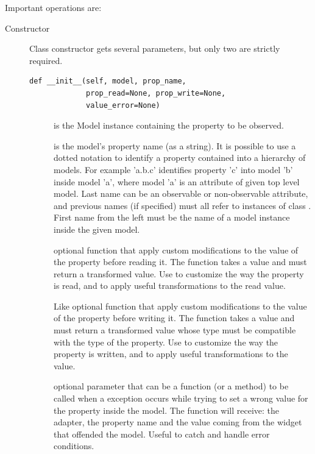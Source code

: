 Important operations are:

\begin{description}
\item [Constructor] Class constructor gets several parameters, but
  only two are strictly required.
{
\codesize
\begin{verbatim}
def __init__(self, model, prop_name, 
             prop_read=None, prop_write=None, 
             value_error=None)
\end{verbatim}
}

\begin{description}
  \item [] is the Model instance containing the
    property to be observed.

  \item [] is the model's property name (as a
    string). It is possible to use a dotted notation to identify a
    property contained into a hierarchy of models. For example
    'a.b.c' identifies property 'c' into model 'b' inside model 'a',
    where model 'a' is an attribute of given top level model. Last
    name can be an observable or non-observable attribute, and
    previous names (if specified) must all refer to instances of
    class . First name from the left must be the
    name of a model instance inside the given model.

  \item [] optional function that apply custom
    modifications to the value of the property before reading
    it. The function takes a value and must return a transformed
    value. Use to customize the way the property is read, and to
    apply useful transformations to the read value.

  \item [] Like  optional
    function that apply custom modifications to the value of the
    property before writing it. The function takes a value and must
    return a transformed value whose type must be compatible with
    the type of the property. Use to customize the way the property
    is written, and to apply useful transformations to the value.

  \item [] optional parameter that can be a
    function (or a method) to be called when a 
    exception occurs while trying to set a wrong value for the
    property inside the model. The function will receive: the
    adapter, the property name and the value coming from the widget
    that offended the model. Useful to catch and handle error
    conditions.


\end{description}
\end{description}
